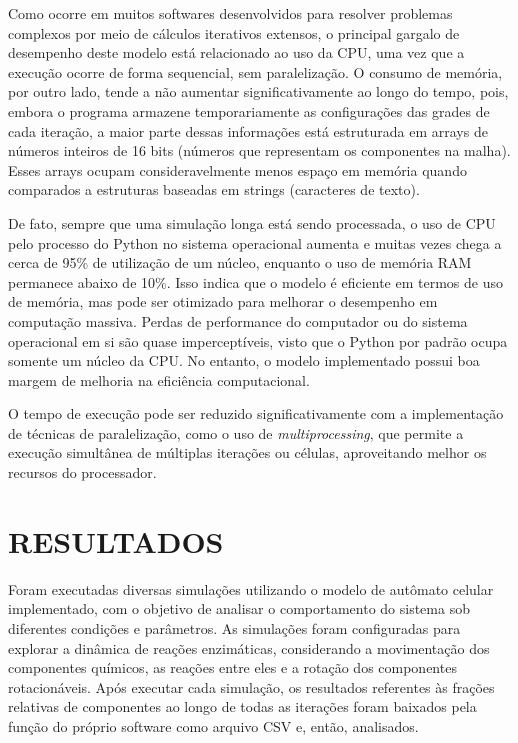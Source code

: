 \documentclass[12pt,oneside]{report}
\begin{document}
Como ocorre em muitos softwares desenvolvidos para resolver problemas complexos por meio de cálculos iterativos extensos, o principal gargalo de desempenho deste modelo está relacionado ao uso da CPU, uma vez que a execução ocorre de forma sequencial, sem paralelização. O consumo de memória, por outro lado, tende a não aumentar significativamente ao longo do tempo, pois, embora o programa armazene temporariamente as configurações das grades de cada iteração, a maior parte dessas informações está estruturada em arrays de números inteiros de 16 bits (números que representam os componentes na malha). Esses arrays ocupam consideravelmente menos espaço em memória quando comparados a estruturas baseadas em strings (caracteres de texto).

De fato, sempre que uma simulação longa está sendo processada, o uso de CPU pelo processo do Python no sistema operacional aumenta e muitas vezes chega a cerca de 95\% de utilização de um núcleo, enquanto o uso de memória RAM permanece abaixo de 10\%. Isso indica que o modelo é eficiente em termos de uso de memória, mas pode ser otimizado para melhorar o desempenho em computação massiva. Perdas de performance do computador ou do sistema operacional em si são quase imperceptíveis, visto que o Python por padrão ocupa somente um núcleo da CPU. No entanto, o modelo implementado possui boa margem de melhoria na eficiência computacional.

O tempo de execução pode ser reduzido significativamente com a implementação de técnicas de paralelização, como o uso de \textit{multiprocessing}, que permite a execução simultânea de múltiplas iterações ou células, aproveitando melhor os recursos do processador.

\chapter{RESULTADOS}

Foram executadas diversas simulações utilizando o modelo de autômato celular implementado, com o objetivo de analisar o comportamento do sistema sob diferentes condições e parâmetros. As simulações foram configuradas para explorar a dinâmica de reações enzimáticas, considerando a movimentação dos componentes químicos, as reações entre eles e a rotação dos componentes rotacionáveis. Após executar cada simulação, os resultados referentes às frações relativas de componentes ao longo de todas as iterações foram baixados pela função do próprio software como arquivo CSV e, então, analisados.
\end{document}
